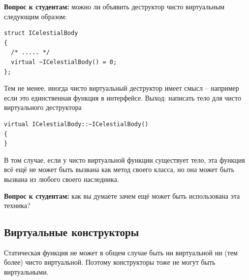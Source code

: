 \documentclass[a4paper,12pt,oneside]{book}
\newif\ifanswers
\begin{document}
\textbf{Вопрос к студентам:} можно ли объявить деструктор чисто виртуальным следующим образом:

\begin{lstlisting}
struct ICelestialBody
{
  /* ..... */
  virtual ~ICelestialBody() = 0;
};
\end{lstlisting}

\ifanswers
Правильный ответ: да, можно, но это приведет к pure virtual function call при попытке унчитожить любого наследника такого класса.
\fi

Тем не менее, иногда чисто виртуальный деструктор имеет смысл -- например если это единственная функция в интерфейсе. Выход: написать тело для чисто виртуального деструктора

\begin{lstlisting}
virtual ICelestialBody::~ICelestialBody()
{
}
\end{lstlisting}

В том случае, если у чисто виртуальной функции существует тело, эта функция всё ещё не может быть вызвана как метод своего класса, но она может быть вызвана из любого своего наследника.

\textbf{Вопрос к студентам:} как вы думаете зачем ещё может быть использована эта техника?

\ifanswers
Возможный ответ: для организации разумного поведения по умолчанию, которое наследники должны явно вызывать:

\begin{lstlisting}
class B 
{
public:
  virtual bool f() = 0;
};

bool 
B::f() 
{
  return true;  // this is a good default, but
}               // shouldn't be used blindly

class D : public B 
{
public:
  bool f() 
  {
    return B::f(); // if D wants the default
  }                // behaviour, it has to say so
};
\end{lstlisting}

Но тут возможны и другие варианты: например выдать лучшее сообщение об ошибке чем компилятор и выйти.
\fi

\subsection{Виртуальные конструкторы}\label{VirtCtors}

Статическая функция не может в общем случае быть ни виртуальной ни (тем более) чисто виртуальной. Поэтому конструкторы тоже не могут быть виртуальными.
\end{document}
